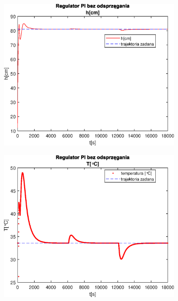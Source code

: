 \begin{figure}[h!]
   \centering
   \begin{subfigure}[b]{0.4\textwidth}
      \includegraphics[width=1\linewidth]{img/PI/noDecoupler/disturbance/PINoDecouplerH2.eps}
      \caption{}
      \label{fig:fig:PIDecoupler21}
   \end{subfigure}
       
   \begin{subfigure}[b]{0.4\textwidth}
      \includegraphics[width=1\linewidth]{img/PI/noDecoupler/disturbance/PINoDecouplerT2.eps}
      \caption{}
      \label{fig:fig:PIDecoupler22}
   \end{subfigure}
       

\end{figure}
